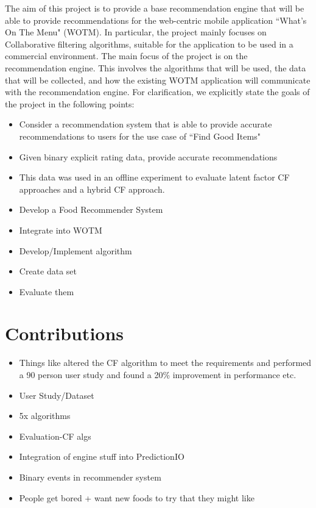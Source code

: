 The aim of this project is to provide a base recommendation engine that will be able to provide recommendations for the web-centric mobile application ``What's On The Menu" (WOTM). In particular, the project mainly focuses on Collaborative filtering algorithms, suitable for the application to be used in a commercial environment. The main focus of the project is on the recommendation engine. This involves the algorithms that will be used, the data that will be collected, and how the existing WOTM application will communicate with the recommendation engine. 
For clarification, we explicitly state the goals of the project in the following points:
\begin{itemize}
	\item{Consider a recommendation system that is able to provide accurate recommendations to users for the use case of ``Find Good Items"}
	\item{Given binary explicit rating data, provide accurate recommendations}
	\item{This data was used in an offline experiment to evaluate latent factor CF approaches and a hybrid CF approach.}
	\item{Develop a Food Recommender System}
	\item{Integrate into WOTM}
	\item{Develop/Implement algorithm}
	\item{Create data set}
	\item{Evaluate them}
\end{itemize}



\section{Contributions}
\begin{itemize}
    \item{Things like altered the CF algorithm to meet the requirements and performed a 90 person user study and found a 20\% improvement in performance etc.}
	\item{User Study/Dataset}
	\item{5x algorithms}
	\item{Evaluation-CF algs}
	\item{Integration of engine stuff into PredictionIO}
	\item{Binary events in recommender system}
	\item{People get bored + want new foods to try that they might like}
\end{itemize}